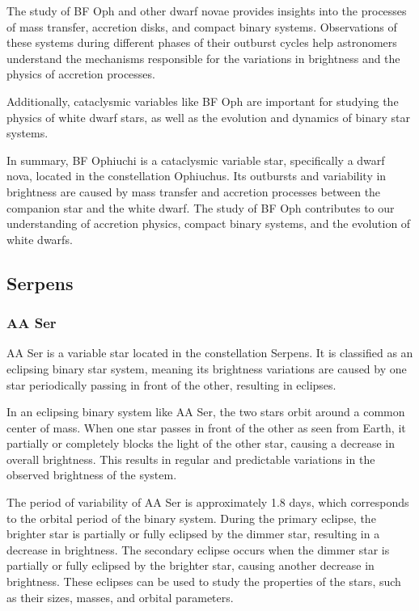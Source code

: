 The study of BF Oph and other dwarf novae provides insights into the processes of mass transfer, accretion disks, and compact binary systems. Observations of these systems during different phases of their outburst cycles help astronomers understand the mechanisms responsible for the variations in brightness and the physics of accretion processes.

Additionally, cataclysmic variables like BF Oph are important for studying the physics of white dwarf stars, as well as the evolution and dynamics of binary star systems.

In summary, BF Ophiuchi is a cataclysmic variable star, specifically a dwarf nova, located in the constellation Ophiuchus. Its outbursts and variability in brightness are caused by mass transfer and accretion processes between the companion star and the white dwarf. The study of BF Oph contributes to our understanding of accretion physics, compact binary systems, and the evolution of white dwarfs.

\subsection{Serpens}


\subsubsection*{ AA Ser }
AA Ser is a variable star located in the constellation Serpens. It is classified as an eclipsing binary star system, meaning its brightness variations are caused by one star periodically passing in front of the other, resulting in eclipses.

In an eclipsing binary system like AA Ser, the two stars orbit around a common center of mass. When one star passes in front of the other as seen from Earth, it partially or completely blocks the light of the other star, causing a decrease in overall brightness. This results in regular and predictable variations in the observed brightness of the system.

The period of variability of AA Ser is approximately 1.8 days, which corresponds to the orbital period of the binary system. During the primary eclipse, the brighter star is partially or fully eclipsed by the dimmer star, resulting in a decrease in brightness. The secondary eclipse occurs when the dimmer star is partially or fully eclipsed by the brighter star, causing another decrease in brightness. These eclipses can be used to study the properties of the stars, such as their sizes, masses, and orbital parameters.

